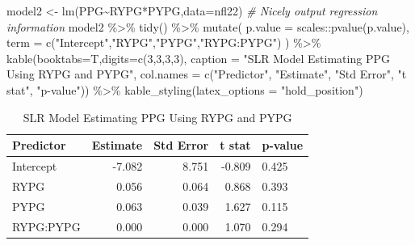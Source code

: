 \documentclass[
  11pt,
]{book}
\newenvironment{Shaded}{\begin{snugshade}}{\end{snugshade}}
\newcommand{\AttributeTok}[1]{\textcolor[rgb]{0.77,0.63,0.00}{#1}}
\newcommand{\CommentTok}[1]{\textcolor[rgb]{0.56,0.35,0.01}{\textit{#1}}}
\newcommand{\DecValTok}[1]{\textcolor[rgb]{0.00,0.00,0.81}{#1}}
\newcommand{\FunctionTok}[1]{\textcolor[rgb]{0.00,0.00,0.00}{#1}}
\newcommand{\NormalTok}[1]{#1}
\newcommand{\OtherTok}[1]{\textcolor[rgb]{0.56,0.35,0.01}{#1}}
\newcommand{\SpecialCharTok}[1]{\textcolor[rgb]{0.00,0.00,0.00}{#1}}
\newcommand{\StringTok}[1]{\textcolor[rgb]{0.31,0.60,0.02}{#1}}
\theoremstyle{definition}
\theoremstyle{definition}
\theoremstyle{definition}
\theoremstyle{definition}
\theoremstyle{remark}
\begin{document}
\begin{Shaded}
\begin{Highlighting}[]
\NormalTok{model2 }\OtherTok{\textless{}{-}} \FunctionTok{lm}\NormalTok{(PPG}\SpecialCharTok{\textasciitilde{}}\NormalTok{RYPG}\SpecialCharTok{*}\NormalTok{PYPG,}\AttributeTok{data=}\NormalTok{nfl22)}
\CommentTok{\# Nicely output regression information}
\NormalTok{model2 }\SpecialCharTok{\%\textgreater{}\%} \FunctionTok{tidy}\NormalTok{() }\SpecialCharTok{\%\textgreater{}\%}
  \FunctionTok{mutate}\NormalTok{(}
    \AttributeTok{p.value =}\NormalTok{ scales}\SpecialCharTok{::}\FunctionTok{pvalue}\NormalTok{(p.value),}
    \AttributeTok{term =} \FunctionTok{c}\NormalTok{(}\StringTok{"Intercept"}\NormalTok{,}\StringTok{"RYPG"}\NormalTok{,}\StringTok{"PYPG"}\NormalTok{,}\StringTok{"RYPG:PYPG"}\NormalTok{)}
\NormalTok{  ) }\SpecialCharTok{\%\textgreater{}\%}
  \FunctionTok{kable}\NormalTok{(}\AttributeTok{booktabs=}\NormalTok{T,}\AttributeTok{digits=}\FunctionTok{c}\NormalTok{(}\DecValTok{3}\NormalTok{,}\DecValTok{3}\NormalTok{,}\DecValTok{3}\NormalTok{,}\DecValTok{3}\NormalTok{), }
        \AttributeTok{caption =} \StringTok{"SLR Model Estimating PPG Using RYPG and PYPG"}\NormalTok{,}
        \AttributeTok{col.names =} \FunctionTok{c}\NormalTok{(}\StringTok{"Predictor"}\NormalTok{, }\StringTok{"Estimate"}\NormalTok{, }\StringTok{"Std Error"}\NormalTok{, }\StringTok{"t stat"}\NormalTok{, }\StringTok{"p{-}value"}\NormalTok{)) }\SpecialCharTok{\%\textgreater{}\%}
  \FunctionTok{kable\_styling}\NormalTok{(}\AttributeTok{latex\_options =} \StringTok{"hold\_position"}\NormalTok{)}
\end{Highlighting}
\end{Shaded}

\begin{table}[!h]

\caption{\label{tab:unnamed-chunk-229}SLR Model Estimating PPG Using RYPG and PYPG}
\centering
\begin{tabular}[t]{lrrrl}
\toprule
Predictor & Estimate & Std Error & t stat & p-value\\
\midrule
Intercept & -7.082 & 8.751 & -0.809 & 0.425\\
RYPG & 0.056 & 0.064 & 0.868 & 0.393\\
PYPG & 0.063 & 0.039 & 1.627 & 0.115\\
RYPG:PYPG & 0.000 & 0.000 & 1.070 & 0.294\\
\bottomrule
\end{tabular}
\end{table}
\end{document}
